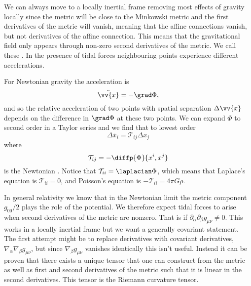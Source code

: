 \documentclass[fleqn]{NotesClass}
\newcommand*{\covariantDerivative}[1]{\nabla_{\!#1}}
\begin{document}
    We can always move to a locally inertial frame removing most effects of gravity locally since the metric will be close to the Minkowski metric and the first derivatives of the metric will vanish, meaning that the affine connections vanish, but not derivatives of the affine connection.
    This means that the gravitational field only appears through non-zero second derivatives of the metric.
    We call these .
    In the presence of tidal forces neighbouring points experience different accelerations.
    
    For Newtonian gravity the acceleration is
    \begin{equation}
        \ddot{\vv{x}} = - \grad \Phi,
    \end{equation}
    and so the relative acceleration of two points with spatial separation \(\Delta\vv{x}\) depends on the difference in \(\grad\Phi\) at these two points.
    We can expand \(\Phi\) to second order in a Taylor series and we find that to lowest order
    \begin{equation}
        \Delta \ddot{x_i} = \mathcal{T}_{ij} \Delta x_j
    \end{equation}
    where
    \begin{equation}
        \mathcal{T}_{ij} = -\diffp{\Phi}{x^i, x^j}
    \end{equation}
    is the Newtonian .
    Notice that \(\mathcal{T}_{ii} = \laplacian\Phi\), which means that Laplace's equation is \(\mathcal{T}_{ii} = 0\), and Poisson's equation is \(-\mathcal{T}_{ii} = 4\pi G\rho\).
    
    In general relativity we know that in the Newtonian limit the metric component \(g_{00}/2\) plays the role of the potential.
    We therefore expect tidal forces to arise when second derivatives of the metric are nonzero.
    That is if \(\partial_\alpha \partial_\beta g_{\mu\nu} \ne 0\).
    This works in a locally inertial frame but we want a generally covariant statement.
    The first attempt might be to replace derivatives with covariant derivatives, \(\covariantDerivative{\alpha}\covariantDerivative{\beta} g_{\mu\nu}\), but since \(\covariantDerivative{\beta}g_{\mu\nu}\) vanishes identically this isn't useful.
    Instead it can be proven that there exists a unique tensor that one can construct from the metric as well as first and second derivatives of the metric such that it is linear in the second derivatives.
    This tensor is the Riemann curvature tensor.
    
\end{document}

